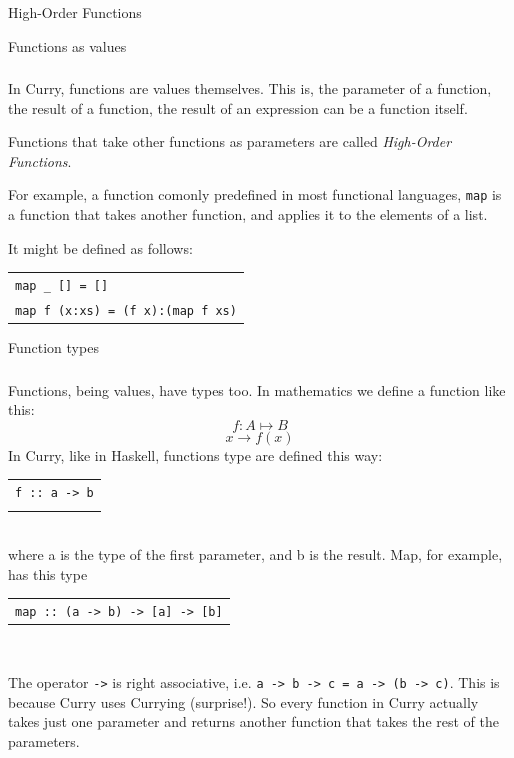 \documentclass{beamer}
\newcommand{\q}[1]{\texttt{#1}}
\begin{document}
\begin{section}{High-Order Functions}
    \begin{subsection}{Functions as values}
      \begin{frame}
        \frametitle{\subsecname}
        In Curry, functions are values themselves. This is, the parameter of a
        function, the result of a function, the result of an expression can be a
        function itself.
    
        Functions that take other functions as parameters are called
        \textit{High-Order Functions}.

        For example, a function comonly predefined in most functional languages,
        \q{map} is a function that takes another function, and applies it to the
        elements of a list.

        It might be defined as follows:
        \begin{tabular}[c]{l}
        \\
        \q{map \_ [] = []}\\
        \q{map f (x:xs) = (f x):(map f xs)}\\
        
        \end{tabular}
      \end{frame}
     \end{subsection}
     \begin{subsection}{Function types}
     \begin{frame}
       \frametitle{\subsecname}
        Functions, being values, have types too. In mathematics we define a
        function like this:
        $$ f : A \mapsto B$$
        $$ x \rightarrow f(x)$$
        In Curry, like in Haskell, functions type are defined this way:
        \begin{tabular}[c]{l}
         \\
         \q{f :: a -> b}\\
         \\
         
        \end{tabular}\\
        where a is the type of the first parameter, and b is the result.
        Map, for example, has this type
        \begin{tabular}[c]{l}
         \\
         \q{map :: (a -> b) -> [a] -> [b]}\\
         
        \end{tabular}\\
      \end{frame}
      \begin{frame}
        The operator \q{->}  is right associative, i.e. \q{a -> b -> c = a -> (b
        -> c)}. This is because Curry uses Currying (surprise!). So every function in Curry
        actually takes just one parameter and returns another function that
        takes the rest of the parameters.


\end{frame}
\end{subsection}
\end{section}
\end{document}
